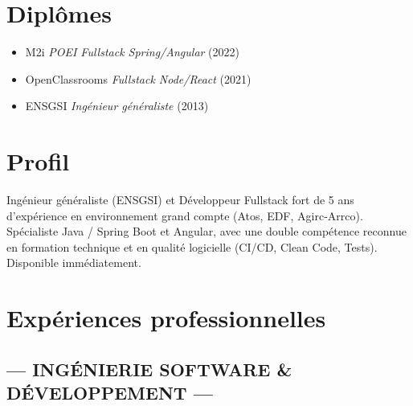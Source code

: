 \documentclass[a4paper,10pt]{article}
\newcommand{\cvtext}{\fontsize{9}{11}\selectfont}
\begin{document}
\begin{minipage}[t]{0.3\textwidth}
  \section*{Diplômes}
  \begin{tcolorbox}[cvbox, width=\linewidth]
    \begin{itemize}[leftmargin=*]
      \item M2i \textit{POEI Fullstack Spring/Angular} (2022)
      \item OpenClassrooms \textit{Fullstack Node/React} (2021)
      \item ENSGSI \textit{Ingénieur généraliste} (2013)
    \end{itemize}
  \end{tcolorbox}
\end{minipage}
\hfill
\begin{minipage}[t]{0.68\textwidth}
\section*{Profil}
Ingénieur généraliste (ENSGSI) et Développeur Fullstack fort de 5 ans d'expérience en environnement grand compte (Atos, EDF, Agirc-Arrco). Spécialiste Java / Spring Boot et Angular, avec une double compétence reconnue en formation technique et en qualité logicielle (CI/CD, Clean Code, Tests). Disponible immédiatement.
\vspace{0.8em}

\section*{Expériences professionnelles}
\begin{tcolorbox}[cvbox, width=\linewidth, fontupper=\cvtext]
    \subsection*{--- INGÉNIERIE SOFTWARE \& DÉVELOPPEMENT ---}
    \vspace{0.3em}


\end{tcolorbox}
\end{minipage}
\end{document}
